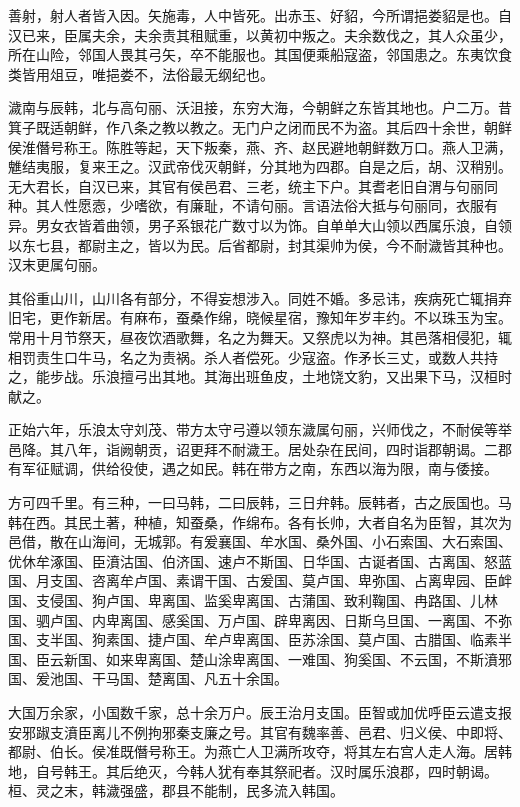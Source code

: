 \documentclass[12pt,UTF8]{ctexbook}
\begin{document}
善射，射人者皆入因。矢施毒，人中皆死。出赤玉、好貂，今所谓挹娄貂是也。自汉已来，臣属夫余，夫余责其租赋重，以黄初中叛之。夫余数伐之，其人众虽少，所在山险，邻国人畏其弓矢，卒不能服也。其国便乘船寇盗，邻国患之。东夷饮食类皆用俎豆，唯挹娄不，法俗最无纲纪也。

濊南与辰韩，北与高句丽、沃沮接，东穷大海，今朝鲜之东皆其地也。户二万。昔箕子既适朝鲜，作八条之教以教之。无门户之闭而民不为盗。其后四十余世，朝鲜侯淮僭号称王。陈胜等起，天下叛秦，燕、齐、赵民避地朝鲜数万口。燕人卫满，魋结夷服，复来王之。汉武帝伐灭朝鲜，分其地为四郡。自是之后，胡、汉稍别。无大君长，自汉已来，其官有侯邑君、三老，统主下户。其耆老旧自渭与句丽同种。其人性愿悫，少嗜欲，有廉耻，不请句丽。言语法俗大抵与句丽同，衣服有异。男女衣皆着曲领，男子系银花广数寸以为饰。自单单大山领以西属乐浪，自领以东七县，都尉主之，皆以为民。后省都尉，封其渠帅为侯，今不耐濊皆其种也。汉末更属句丽。

其俗重山川，山川各有部分，不得妄想涉入。同姓不婚。多忌讳，疾病死亡辄捐弃旧宅，更作新居。有麻布，蚕桑作绵，晓候星宿，豫知年岁丰约。不以珠玉为宝。常用十月节祭天，昼夜饮酒歌舞，名之为舞天。又祭虎以为神。其邑落相侵犯，辄相罚责生口牛马，名之为责祸。杀人者偿死。少寇盗。作矛长三丈，或数人共持之，能步战。乐浪擅弓出其地。其海出班鱼皮，土地饶文豹，又出果下马，汉桓时献之。

正始六年，乐浪太守刘茂、带方太守弓遵以领东濊属句丽，兴师伐之，不耐侯等举邑降。其八年，诣阙朝贡，诏更拜不耐濊王。居处杂在民间，四时诣郡朝谒。二郡有军征赋调，供给役使，遇之如民。韩在带方之南，东西以海为限，南与倭接。

方可四千里。有三种，一曰马韩，二曰辰韩，三日弁韩。辰韩者，古之辰国也。马韩在西。其民土著，种植，知蚕桑，作绵布。各有长帅，大者自名为臣智，其次为邑借，散在山海间，无城郭。有爰襄国、牟水国、桑外国、小石索国、大石索国、优休牟涿国、臣濆沽国、伯济国、速卢不斯国、日华国、古诞者国、古离国、怒蓝国、月支国、咨离牟卢国、素谓干国、古爰国、莫卢国、卑弥国、占离卑园、臣衅国、支侵国、狗卢国、卑离国、监奚卑离国、古蒲国、致利鞠国、冉路国、儿林国、驷卢国、内卑离国、感奚国、万卢国、辟卑离因、日斯乌旦国、一离国、不弥国、支半国、狗素国、捷卢国、牟卢卑离国、臣苏涂国、莫卢国、古腊国、临素半国、臣云新国、如来卑离国、楚山涂卑离国、一难国、狗奚国、不云国，不斯濆邪国、爰池国、干马国、楚离国、凡五十余国。

大国万余家，小国数千家，总十余万户。辰王治月支国。臣智或加优呼臣云遣支报安邪踧支濆臣离儿不例拘邪秦支廉之号。其官有魏率善、邑君、归义侯、中即将、都尉、伯长。侯准既僭号称王。为燕亡人卫满所攻夺，将其左右宫人走人海。居韩地，自号韩王。其后绝灭，今韩人犹有奉其祭祀者。汉时属乐浪郡，四时朝谒。桓、灵之末，韩濊强盛，郡县不能制，民多流入韩国。
\end{document}
